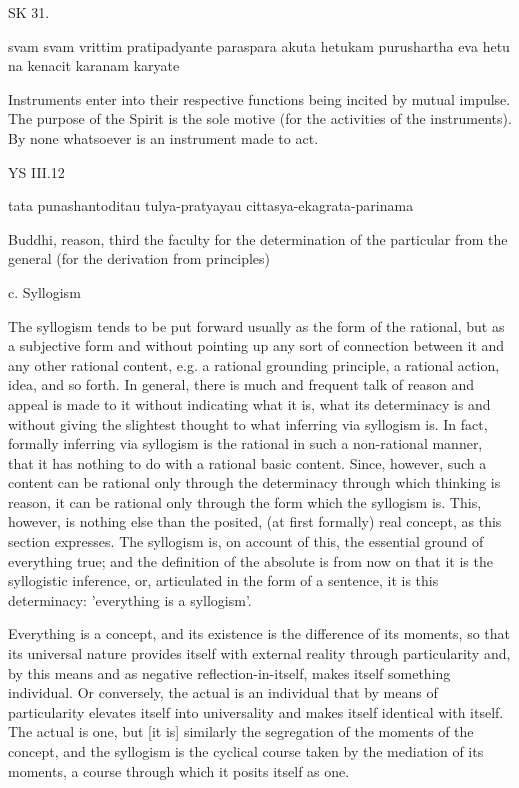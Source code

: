 SK 31.

svam svam vrittim pratipadyante paraspara akuta hetukam
purushartha eva hetu na kenacit karanam karyate

Instruments enter into their respective functions being incited by mutual impulse.
The purpose of the Spirit is the sole motive (for the activities of the instruments).
By none whatsoever is an instrument made to act.

YS III.12

tata punashantoditau tulya-pratyayau cittasya-ekagrata-parinama

Buddhi, reason, third the faculty for the determination of the particular
from the general (for the derivation from principles)

c. Syllogism

The syllogism tends to be put forward usually as the form of the rational,
but as a subjective form and without pointing up any sort
of connection between it and any other rational content, e.g. a
rational grounding principle, a rational action, idea, and so forth.
In general, there is much and frequent talk of reason and appeal is
made to it without indicating what it is, what its determinacy is and
without giving the slightest thought to what inferring via syllogism is.
In fact, formally inferring via syllogism is the rational in
such a non-rational manner, that it has nothing to do
with a rational basic content. Since, however, such a content can be
rational only through the determinacy through which thinking is
reason, it can be rational only through the form which the syllogism is.
This, however, is nothing else than the posited, (at first formally) real concept,
as this section expresses.
The syllogism is, on account of this, the essential ground of everything true;
and the definition of the absolute is from now on that it is the syllogistic inference,
or, articulated in the form of a sentence, it is this determinacy:
'everything is a syllogism'.

Everything is a concept, and its existence is the difference of its moments,
so that its universal nature provides itself with external reality
through particularity and, by this means and as negative reflection-in-itself,
makes itself something individual.
Or conversely, the actual is an individual that by means
of particularity elevates itself into universality and
makes itself identical with itself.
The actual is one, but [it is] similarly the segregation of
the moments of the concept, and
the syllogism is the cyclical course taken by the mediation of its moments,
a course through which it posits itself as one.

